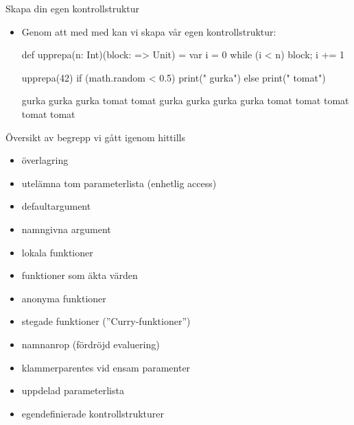 \begin{Slide}{Skapa din egen kontrollstruktur}
\begin{itemize}
\item Genom att   med  med  kan vi skapa vår egen kontrollstruktur:
\begin{Code}
def upprepa(n: Int)(block: => Unit) = {
  var i = 0
  while (i < n) { block; i += 1 }
}
\end{Code}

\pause

\begin{Code}
upprepa(42){
  if (math.random < 0.5) print(" gurka")
  else print(" tomat")
}
\end{Code}

\pause

\begin{REPLnonum}
gurka gurka gurka tomat tomat gurka gurka gurka gurka tomat tomat tomat tomat tomat
\end{REPLnonum}
\end{itemize}
\end{Slide}



\begin{Slide}{Översikt av begrepp vi gått igenom hittills}
\begin{itemize}
\item överlagring
\item utelämna tom parameterlista (enhetlig access)
\item defaultargument
\item namngivna argument
\item lokala funktioner
\item funktioner som äkta värden
\item anonyma funktioner
\item stegade funktioner (''Curry-funktioner'')
\item namnanrop (fördröjd evaluering)
\item klammerparentes vid ensam paramenter
\item uppdelad parameterlista
\item egendefinierade kontrollstrukturer
\end{itemize}
\end{Slide}


